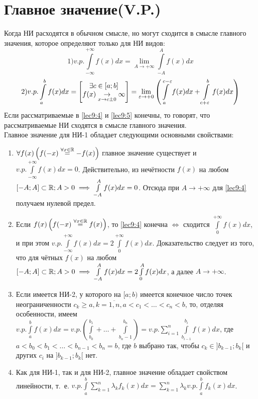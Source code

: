 \documentclass[../../main.tex]{subfiles}
\begin{document}
\section{Главное значение(V.P.)}
Когда НИ расходятся в обычном смысле, но могут сходится в смысле главного
значения, которое определяют только для НИ видов:
\begin{equation}
\label{lec9:4} 1) v.p. 
\int\limits_{-\infty}^{+\infty} f(x) dx = 
\lim\limits_{A \to +\infty} \int\limits_{-A}^A f(x)dx
\end{equation}
\begin{equation}
\label{lec9:5} 2) v.p.
\int\limits_a^b f(x) dx = \begin{bmatrix}
	\exists c \in \left[a; b\right]\\
	f(x) \underset{x \to c \pm 0}{\to} \infty
\end{bmatrix} =
\lim\limits_{\varepsilon \to +0} \left(
\int\limits_a^{c - \varepsilon} f(x) dx + 
\int\limits_{c + \varepsilon}^b f(x) dx
\right)
\end{equation}
Если рассматриваемые в \eqref{lec9:4} и \eqref{lec9:5} конечны, то
говорят, что рассматриваемые НИ сходятся в смысле главного значения.\\
Главное значение для НИ-1 обладает следующими основными свойствами:\\
\begin{enumerate}[label=\arabic*$^{\circ}$.]
\item
$ \forall f(x) \left(f(-x) \stackrel{\forall x \in \mathbb{R}}{=} -f(x) \right) $
главное значение существует и $ v.p. \int\limits_{-\infty}^{+\infty}f(x)dx=0$.
Действительно, из нечётности $ f(x) $ на любом $ [-A; A] \subset \mathbb{R}; A > 0 
\implies \int\limits_{-A}^A f(x) dx = 0$. Отсюда при $ A \to +\infty $ для
\eqref{lec9:4} получаем нулевой предел.
\item
Если $ f(x) \left(f(-x) \stackrel{\forall x \in \mathbb{R}}{=} f(x) \right) $, то
\eqref{lec9:4} конечна $ \iff $ сходится $ \int\limits_0^{+\infty}f(x)dx $, и 
при этом $ v.p. \int\limits_{-\infty}^{+\infty} f(x) dx = 
2\int\limits_0^{+\infty} f(x) dx$. Доказательство следует из того, что для
чётных $ f(x) $ на любом $ [-A; A] \subset \mathbb{R}; A > 0 
\implies \int\limits_{-A}^A f(x) dx = 2\int\limits_0^A f(x) dx$, а далее 
$ A \to +\infty $.
\item
Если имеется НИ-2, у которого на $ [a; b) $ имеется конечное число точек
неограниченности $ c_k \geq a, k = \overline{1,n}, a < c_1 < \dots <
c_n < b $, то, отделяя особенности, имеем $ v.p. \int\limits_a^b f(x) dx = 
v.p. \left(\int\limits_{b_0}^{b_1} + \dots + \int\limits_{b_n - 1}^{b_n}
\right) = v.p. \sum\limits_{i = 1}^n \int\limits_{b_{i - 1}}^{b_i} f(x)dx $,
где $ a < b_0 < b_1 < \dots < b_{n - 1} < b_n = b $, где $ b $ выбрано так, 
чтобы $ c_k \in ]b_{k - 1}; b_k[ $ и других $ c_i $ 
на $ ]b_{k - 1}; b_k[ $ нет.
\item
Как для НИ-1, так и для НИ-2, главное значение обладает свойством линейности,
т.~е. $ v.p. \int\limits_a^b \sum\limits_{k = 1}^n \lambda_kf_k(x)dx =
\sum\limits_{k = 1}^n \lambda_k v.p. \int\limits_a^b f_k(x)dx$.
\end{enumerate}
\end{document}
